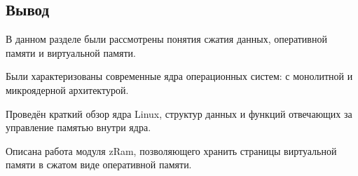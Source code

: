 \subsection*{Вывод}

В данном разделе были рассмотрены понятия сжатия данных, оперативной памяти и виртуальной памяти. 

Были характеризованы современные ядра операционных систем: с монолитной и микроядерной архитектурой. 

Проведён краткий обзор ядра Linux, структур данных и функций отвечающих за управление памятью внутри ядра.

Описана работа модуля zRam, позволяющего хранить страницы виртуальной памяти в сжатом виде оперативной памяти.

\pagebreak
